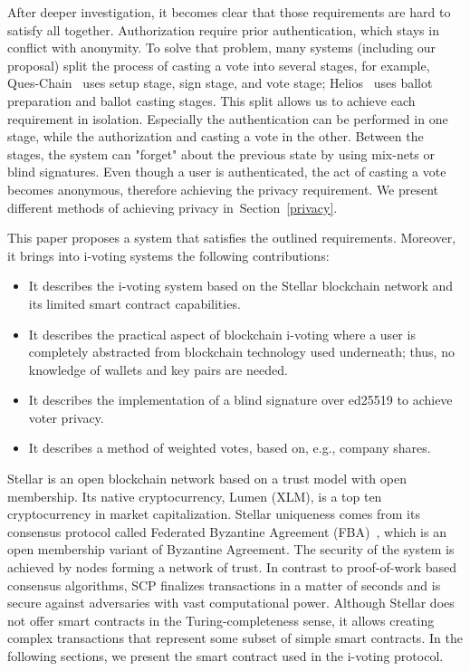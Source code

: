 \documentclass[applsci,article,accept,moreauthors,pdftex]{Definitions/mdpi}
\begin{document}
After deeper investigation, it becomes clear that those requirements are hard to satisfy all together. Authorization require prior authentication, which stays in conflict with anonymity. 
To solve that problem, many systems (including our proposal) split the process of casting a vote into several stages, for example, Ques-Chain~\cite{zhang2019ques} uses setup stage, sign stage, and vote stage; Helios~\cite{adida2008helios} uses ballot preparation and ballot casting stages. This split allows us to achieve each requirement in isolation. Especially the authentication can be performed in one stage, while the authorization and casting a vote in the other. Between the stages, the system can "forget" about the previous state by using mix-nets or blind signatures. Even though a user is authenticated, the act of casting a vote becomes anonymous, therefore achieving the privacy requirement. We present different methods of achieving privacy in~Section~\ref{privacy}.

This paper proposes a system that satisfies the outlined requirements. Moreover, it brings into i-voting systems the following contributions:
\begin{itemize}
    \item It describes the i-voting system based on the Stellar blockchain network and its limited smart contract capabilities.
    \item It describes the practical aspect of blockchain i-voting where a user is completely abstracted from blockchain technology used underneath; thus, no knowledge of wallets and key pairs are needed.
    \item It describes the implementation of a blind signature over ed25519 to achieve voter privacy.
    \item It describes a method of weighted votes, based on, e.g., company shares.
\end{itemize}
 

Stellar is an open blockchain network based on a trust model with open membership. Its native cryptocurrency, Lumen (XLM), is a top ten cryptocurrency in market capitalization. Stellar uniqueness comes from its consensus protocol called Federated Byzantine Agreement (FBA)~\cite{mazieres2015Stellar}, which is an open membership variant of Byzantine Agreement. The security of the system is achieved by nodes forming a network of trust. In contrast to proof-of-work based consensus algorithms, SCP %
finalizes transactions in a matter of seconds and is secure against adversaries with vast computational power. Although Stellar does not offer smart contracts in the Turing-completeness sense, it allows creating complex transactions that represent some subset of simple smart contracts. In the following sections, we present the smart contract used in the i-voting protocol.
\end{document}
